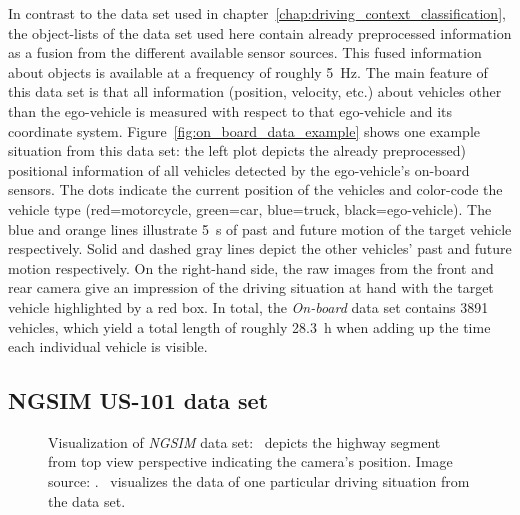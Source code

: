 In contrast to the data set used in chapter~\ref{chap:driving_context_classification}, the object-lists of the data set used here contain already preprocessed information as a fusion from the different available sensor sources.
This fused information about objects is available at a frequency of roughly \SI{5}{\hertz}.
The main feature of this data set is that all information (position, velocity, etc.) about vehicles other than the ego-vehicle is measured with respect to that ego-vehicle and its coordinate system.
Figure~\ref{fig:on_board_data_example} shows one example situation from this data set: the left plot depicts the already preprocessed) positional information of all vehicles detected by the ego-vehicle's on-board sensors.
The dots indicate the current position of the vehicles and color-code the vehicle type (red=motorcycle, green=car, blue=truck, black=ego-vehicle).
The blue and orange lines illustrate \SI{5}{\second} of past and future motion of the target vehicle respectively.
Solid and dashed gray lines depict the other vehicles' past and future motion respectively.
On the right-hand side, the raw images from the front and rear camera give an impression of the driving situation at hand with the target vehicle highlighted by a red box.
In total, the \emph{On-board} data set contains \num{3891} vehicles, which yield a total length of roughly \SI{28.3}{\hour} when adding up the time each individual vehicle is visible.

\subsection{\acs{NGSIM} US-101 data set}
\label{subsec:ngsim-dataset}

\begin{figure}[t!]
	\centering
    \caption{Visualization of \emph{\ac{NGSIM}} data set:~\protect{} depicts the highway segment from top view perspective indicating the camera's position. Image source: \textcite{NGSIM-US101}.~\protect{} visualizes the data of one particular driving situation from the data set.}\label{fig:ngsim_dataset}
\end{figure}

